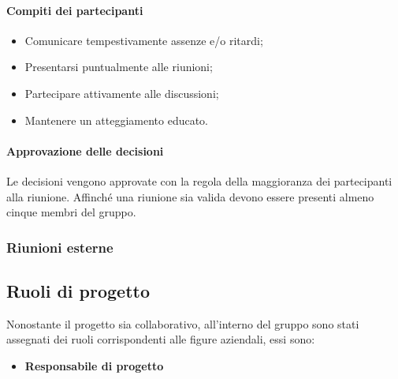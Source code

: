                      \paragraph{Compiti dei partecipanti}
                        \begin{itemize}
                            \item Comunicare tempestivamente assenze e/o ritardi; 
                            \item Presentarsi puntualmente alle riunioni;
                            \item Partecipare attivamente alle discussioni;
                            \item Mantenere un atteggiamento educato.
                        \end{itemize}
                    \paragraph{Approvazione delle decisioni}
                        Le decisioni vengono approvate con la regola della maggioranza dei partecipanti alla riunione.
                        Affinché una riunione sia valida devono essere presenti almeno cinque membri del gruppo.
                        
                  \subsubsection{Riunioni esterne}
                  
            \subsection{Ruoli di progetto}
                Nonostante il progetto sia collaborativo, all'interno del gruppo sono stati assegnati dei ruoli corrispondenti alle figure aziendali, essi sono:
                \begin{itemize}
                    \item \textbf{Responsabile di progetto}
                \end{itemize}
                       
                     
                
            
    
     
            
            